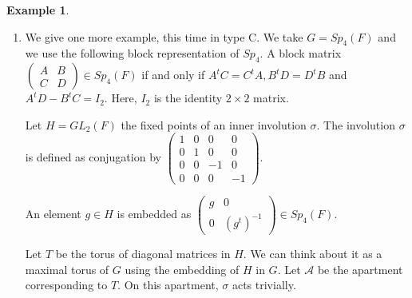 \documentclass[12pt]{article}
\newcommand{\p}{\mathbb{P}}
\newcommand{\A}{\mathcal{A}}
\newcommand{\<}{\langle}
\renewcommand{\>}{\rangle}
\theoremstyle{plain}
\theoremstyle{definition}
\newtheorem{exmp}[theorem]{Example} %
\begin{document}
\begin{exmp}
\begin{enumerate}
        The map $b_L$ is a map between chambers that contain $L$ to the flag variety of $SL_3(k)\cap GL_2(k)\times GL_1(k)$ which is $\p^1(k)$. It sends an Iwahori subgroup contained in $P\cap \sigma(P)$ to its reduction modulo $\pi$, a Borel subgroup of  $SL_3(k)\cap GL_2(k)\times GL_1(k)$.
        
        
        The involution $\sigma$ acts on $SL_3(k)\cap GL_2(k)\times GL_1(k)$ as transpose inverse and its fixed points are $SL_3(k)\cap O_2(k)\times O_1(k)$. The $H$ orbits on $C_L$ are mapped to $SL_3(k)\cap O_2(k)\times O_1(k)$ orbits on $\p^1(k)$.

        \item We give one more example, this time in type C. 
        We take $G=Sp_4(F)$ and we use the following block representation of  $Sp_4$. A block matrix $\begin{pmatrix}
            A & B\\
            C& D
        \end{pmatrix}\in Sp_4(F)$ if and only if $A^tC=C^tA, B^tD=D^tB$ and $A^tD-B^tC=I_2$. Here, $I_2$ is the identity $2\times 2$ matrix.
                
        Let $H=GL_2(F)$ the fixed points of an inner involution $\sigma$. The involution $\sigma$ is defined as conjugation by $\begin{pmatrix}
            1 & 0 &0 &0\\
            0 & 1 & 0& 0\\
            0& 0& -1 &0\\
            0&0&0& -1
        \end{pmatrix}$.

        
        An element $g\in H$ is embedded as $\begin{pmatrix}
            g & 0\\
            0 & (g^t)^{-1}
        \end{pmatrix}\in Sp_4(F)$.
        

        Let $T$ be the torus of diagonal matrices in $H$. We can think about it as a maximal torus of $G$ using the embedding of $H$ in $G$. Let $\A$ be the apartment corresponding to $T$. On this apartment, $\sigma$ acts trivially.


\end{enumerate}
\end{exmp}
\end{document}

